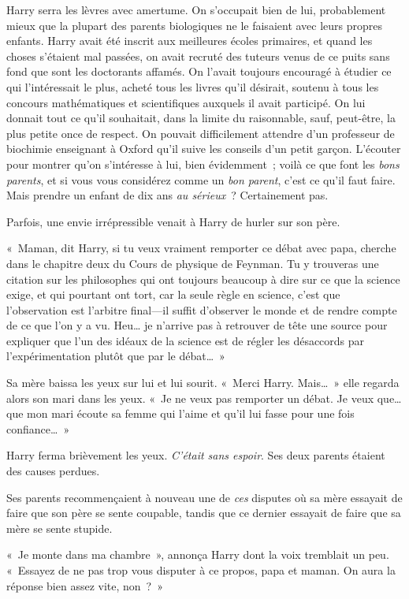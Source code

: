 Harry serra les lèvres avec amertume. On s'occupait bien de lui, probablement mieux que la plupart des parents biologiques ne le faisaient avec leurs propres enfants. Harry avait été inscrit aux meilleures écoles primaires, et quand les choses s'étaient mal passées, on avait recruté des tuteurs venus de ce puits sans fond que sont les doctorants affamés. On l'avait toujours encouragé à étudier ce qui l'intéressait le plus, acheté tous les livres qu'il désirait, soutenu à tous les concours mathématiques et scientifiques auxquels il avait participé. On lui donnait tout ce qu'il souhaitait, dans la limite du raisonnable, sauf, peut-être, la plus petite once de respect. On pouvait difficilement attendre d'un professeur de biochimie enseignant à Oxford qu'il suive les conseils d'un petit garçon. L'écouter pour montrer qu'on s'intéresse à lui, bien évidemment~; voilà ce que font les \emph{bons parents}, et si vous vous considérez comme un \emph{bon parent}, c'est ce qu'il faut faire. Mais prendre un enfant de dix ans \emph{au sérieux}~? Certainement pas.

Parfois, une envie irrépressible venait à Harry de hurler sur son père.

«~Maman, dit Harry, si tu veux vraiment remporter ce débat avec papa, cherche dans le chapitre deux du Cours de physique de Feynman. Tu y trouveras une citation sur les philosophes qui ont toujours beaucoup à dire sur ce que la science exige, et qui pourtant ont tort, car la seule règle en science, c'est que l'observation est l'arbitre final---il suffit d'observer le monde et de rendre compte de ce que l'on y a vu. Heu… je n'arrive pas à retrouver de tête une source pour expliquer que l'un des idéaux de la science est de régler les désaccords par l'expérimentation plutôt que par le débat…~»

Sa mère baissa les yeux sur lui et lui sourit. «~Merci Harry.  Mais…~» elle regarda alors son mari dans les yeux. «~Je ne veux pas remporter un débat. Je veux que… que mon mari écoute sa femme qui l'aime et qu'il lui fasse pour une fois confiance…~»

Harry ferma brièvement les yeux. \emph{C'était sans espoir}. Ses deux parents étaient des causes perdues.

Ses parents recommençaient à nouveau une de \emph{ces} disputes où sa mère essayait de faire que son père se sente coupable, tandis que ce dernier essayait de faire que sa mère se sente stupide.

«~Je monte dans ma chambre~», annonça Harry dont la voix tremblait un peu. «~Essayez de ne pas trop vous disputer à ce propos, papa et maman.  On aura la réponse bien assez vite, non~?~»


